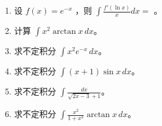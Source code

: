 \documentclass[12pt, a4paper]{article}
\begin{document}
\begin{enumerate}
    \item 设 $ f(x) = e^{-x} $ ，则 $ \int \frac{f'(\ln x)}{x} dx = $ \underline{\hspace{2cm}}。

    \item 计算 $ \int x^{2} \arctan x \, dx $。

    \item 求不定积分 $ \int x^{2}e^{-x} \, dx $。

    \item 求不定积分 $ \int(x+1)\sin x \, dx $。

    \item 求不定积分 $ \int\frac{dx}{\sqrt{2x-3}+1} $。

    \item 求不定积分 $ \int\frac{x^{2}}{1+x^{2}}\arctan x \, dx $。
\end{enumerate}
\end{document}
